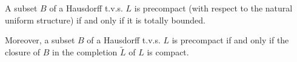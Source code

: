 A subset $B$ of a Hausdorff t.v.s. $L$ is precompact (with respect to the natural uniform structure) if and only if it is totally bounded.

Moreover, a subset $B$ of a Hausdorff t.v.s. $L$ is precompact if and only if the closure of $B$ in the completion $\tilde{L}$ of $L$ is compact.
